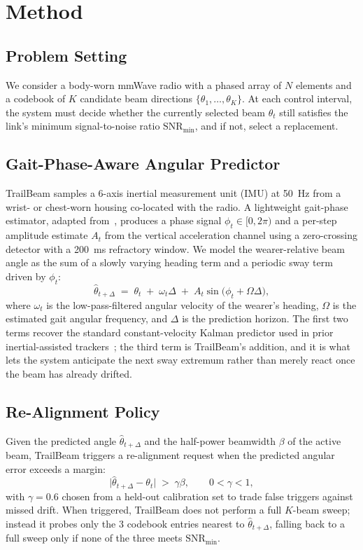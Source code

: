 \section{Method}
\subsection{Problem Setting}
We consider a body-worn mmWave radio with a phased array of $N$ elements and a codebook of $K$ candidate beam directions $\{\theta_1,\dots,\theta_K\}$. At each control interval, the system must decide whether the currently selected beam $\theta_t$ still satisfies the link's minimum signal-to-noise ratio $\mathrm{SNR}_{\min}$, and if not, select a replacement.

\subsection{Gait-Phase-Aware Angular Predictor}
TrailBeam samples a 6-axis inertial measurement unit (IMU) at 50~Hz from a wrist- or chest-worn housing co-located with the radio. A lightweight gait-phase estimator, adapted from~\cite{demirci2020gait}, produces a phase signal $\phi_t \in [0, 2\pi)$ and a per-step amplitude estimate $A_t$ from the vertical acceleration channel using a zero-crossing detector with a 200~ms refractory window. We model the wearer-relative beam angle as the sum of a slowly varying heading term and a periodic sway term driven by $\phi_t$:
\begin{equation}
\hat{\theta}_{t+\Delta} \;=\; \theta_t \;+\; \omega_t \Delta \;+\; A_t \sin\!\big(\phi_t + \Omega \Delta\big),
\label{eq:beam-predict}
\end{equation}
where $\omega_t$ is the low-pass-filtered angular velocity of the wearer's heading, $\Omega$ is the estimated gait angular frequency, and $\Delta$ is the prediction horizon. The first two terms recover the standard constant-velocity Kalman predictor used in prior inertial-assisted trackers~\cite{kowalczyk2021kalman}; the third term is TrailBeam's addition, and it is what lets the system anticipate the next sway extremum rather than merely react once the beam has already drifted.

\subsection{Re-Alignment Policy}
Given the predicted angle $\hat{\theta}_{t+\Delta}$ and the half-power beamwidth $\beta$ of the active beam, TrailBeam triggers a re-alignment request when the predicted angular error exceeds a margin:
\[
\lvert \hat{\theta}_{t+\Delta} - \theta_t \rvert \; > \; \gamma \beta, \qquad 0 < \gamma < 1,
\]
with $\gamma = 0.6$ chosen from a held-out calibration set to trade false triggers against missed drift. When triggered, TrailBeam does not perform a full $K$-beam sweep; instead it probes only the $3$ codebook entries nearest to $\hat{\theta}_{t+\Delta}$, falling back to a full sweep only if none of the three meets $\mathrm{SNR}_{\min}$.

